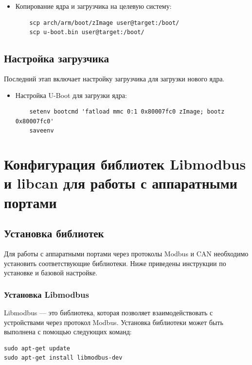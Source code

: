 \documentclass[16pt]{article}
\begin{document}
\begin{itemize}
    \item Копирование ядра и загрузчика на целевую систему:
    \begin{verbatim}
    scp arch/arm/boot/zImage user@target:/boot/
    scp u-boot.bin user@target:/boot/
    \end{verbatim}
\end{itemize}

\subsection{Настройка загрузчика}

Последний этап включает настройку загрузчика для загрузки нового ядра.

\begin{itemize}
    \item Настройка U-Boot для загрузки ядра:
    \begin{verbatim}
    setenv bootcmd 'fatload mmc 0:1 0x80007fc0 zImage; bootz 0x80007fc0'
    saveenv
    \end{verbatim}
\end{itemize}


\section{Конфигурация библиотек Libmodbus и libcan для работы с аппаратными портами}

\subsection{Установка библиотек}

Для работы с аппаратными портами через протоколы Modbus и CAN необходимо установить соответствующие библиотеки. Ниже приведены инструкции по установке и базовой настройке.

\subsubsection{Установка Libmodbus}

Libmodbus — это библиотека, которая позволяет взаимодействовать с устройствами через протокол Modbus. Установка библиотеки может быть выполнена с помощью следующих команд:

\begin{verbatim}
sudo apt-get update
sudo apt-get install libmodbus-dev
\end{verbatim}
\end{document}
